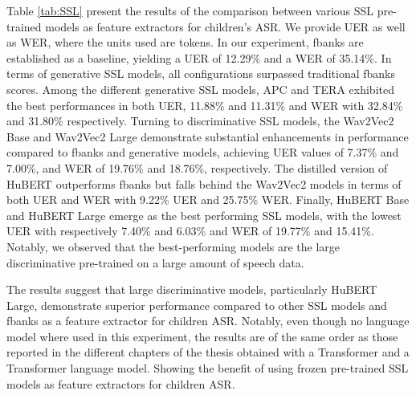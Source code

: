 Table \ref{tab:SSL} present the results of the comparison between various \ac{SSL} pre-trained models as feature extractors for children's \ac{ASR}. We provide \ac{UER} as well as \ac{WER}, where the units used are tokens. In our experiment, \ac{fbanks} are established as a baseline, yielding a \ac{UER} of 12.29\% and a \ac{WER} of 35.14\%. In terms of generative \ac{SSL} models, all configurations surpassed traditional \ac{fbanks} scores. Among the different generative \ac{SSL} models, APC  and \ac{TERA} exhibited the best performances in both \ac{UER}, 11.88\% and 11.31\% and \ac{WER} with 32.84\% and 31.80\% respectively. Turning to discriminative \ac{SSL} models, the Wav2Vec2 Base and Wav2Vec2 Large demonstrate substantial enhancements in performance compared to fbanks and generative models, achieving \ac{UER} values of 7.37\% and 7.00\%, and \ac{WER} of 19.76\% and 18.76\%, respectively. The distilled version of HuBERT outperforms \ac{fbanks} but falls behind the Wav2Vec2 models in terms of both \ac{UER} and \ac{WER} with 9.22\% \ac{UER} and 25.75\% \ac{WER}. Finally, HuBERT Base and HuBERT Large emerge as the best performing \ac{SSL} models, with the lowest \ac{UER} with respectively 7.40\% and 6.03\% and \ac{WER} of 19.77\% and 15.41\%. Notably, we observed that the best-performing models are the large discriminative pre-trained on a large amount of speech data.

The results suggest that large discriminative models, particularly HuBERT Large, demonstrate superior performance compared to other \ac{SSL} models and \ac{fbanks} as a feature extractor for children \ac{ASR}. Notably, even though no language model where used in this experiment, the results are of the same order as those reported in the different chapters of the thesis obtained with a Transformer and a Transformer language model. Showing the benefit of using frozen pre-trained \ac{SSL} models as feature extractors for children \ac{ASR}.


